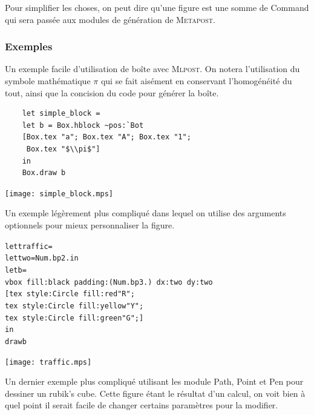 \documentclass[a4paper,12pt]{article}
\newcommand{\mlpost}{\textsc{Mlpost}}
\newcommand{\meta}{\textsc{Metapost}}
\begin{document}
Pour simplifier les choses, on peut dire qu'une figure est une somme de Command qui sera passée aux modules de génération de \meta.


\subsubsection{Exemples}
Un exemple facile d'utilisation de boîte avec \mlpost. On notera l'utilisation du symbole mathématique $\pi$ qui se fait aisément en conservant l'homogénéité du tout, ainsi que la concision du code pour générer la boîte. 

\begin{minipage}{0.7\linewidth}
  \begin{verbatim}
    let simple_block =
    let b = Box.hblock ~pos:`Bot 
    [Box.tex "a"; Box.tex "A"; Box.tex "1"; 
     Box.tex "$\\pi$"] 
    in
    Box.draw b
  \end{verbatim}
\end{minipage}
\begin{minipage}{0.3\linewidth}
  \begin{center}
    \texttt{[image: simple\_block.mps]}
  \end{center}
\end{minipage}


Un exemple légèrement plus compliqué dans lequel on utilise des arguments optionnels pour mieux personnaliser la figure.

\begin{minipage}{0.7\linewidth}
  \begin{alltt}
    let traffic =
    let two = Num.bp 2. in
    let b = 
    vbox ~fill:black ~padding:(Num.bp 3.) ~dx:two ~dy:two
    [ tex ~style:Circle ~fill:red "R";
      tex ~style:Circle ~fill:yellow "Y";
      tex ~style:Circle ~fill:green "G"; ]
    in
    draw b
  \end{alltt}
\end{minipage}
\begin{minipage}{0.3\linewidth}
  \begin{center}
    \texttt{[image: traffic.mps]}
  \end{center}
\end{minipage}

Un dernier exemple plus compliqué utilisant les module Path, Point et Pen pour dessiner un rubik's cube. Cette figure étant le résultat d'un calcul, on voit bien à quel point il serait facile de changer certains paramètres pour la modifier.
\end{document}
